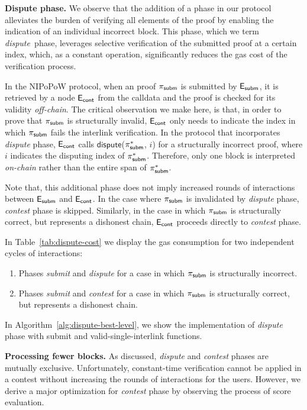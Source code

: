 \newcommand{\dispute}{\emph{dispute\ }} \noindent \textbf{Dispute phase.} We
observe that the addition of a phase in our protocol alleviates the burden of
verifying all elements of the proof by enabling the indication of an individual
incorrect block. This phase, which we term \dispute phase, leverages selective
verification of the submitted proof at a certain index, which, as a constant
operation, significantly reduces the gas cost of the verification process.

In the NIPoPoW protocol, when an proof $\mathsf{\pi_{subm}}$ is submitted by $\mathsf{E_{subm}}$, it is
retrieved by a node $\mathsf{E_{cont}}$ from the calldata and the proof is checked for its
validity \emph{off-chain}. The critical observation we make here, is that, in
order to prove that $\mathsf{\pi_{subm}}$ is structurally invalid, $\mathsf{E_{cont}}$ only needs to
indicate the index in which $\mathsf{\pi_{subm}}$ fails the interlink verification. In the
protocol that incorporates \emph{dispute} phase, $\mathsf{E_{cont}}$ calls
$\textsf{dispute}$($\mathsf{\pi_{subm}^*}$, $i$) for a structurally incorrect proof, where $i$
indicates the disputing index of $\mathsf{\pi_{subm}^*}$. Therefore, only one block is
interpreted \emph{on-chain} rather than the entire span of $\mathsf{\pi_{subm}^*}$.

Note that, this additional phase does not imply increased rounds of
interactions between $\mathsf{E_{subm}}$ and $\mathsf{E_{cont}}$. In the case where $\mathsf{\pi_{subm}}$ is invalidated
by \emph{dispute} phase, \emph{contest} phase is skipped.  Similarly, in the
case in which $\mathsf{\pi_{subm}}$ is structurally correct, but represents a dishonest
chain, $\mathsf{E_{cont}}$ proceeds directly to \emph{contest} phase.

In Table~\ref{tab:dispute-cost} we display the gas consumption for
two independent cycles of interactions:
\begin{enumerate}
    \item Phases \emph{submit} and \emph{dispute} for a case in which $\mathsf{\pi_{subm}}$
is structurally incorrect.
    \item Phases \emph{submit} and \emph{contest} for a case in which
$\mathsf{\pi_{subm}}$ is structurally correct, but represents a dishonest chain.
\end{enumerate}
\noindent
In Algorithm~\ref{alg:dispute-best-level}, we show the implementation of
\emph{dispute} phase with \textsf{submit} and \textsf{valid-single-interlink}
functions.




\textbf{Processing fewer blocks.} As discussed, \emph{dispute} and
\emph{contest} phases are mutually exclusive. Unfortunately, constant-time
verification cannot be applied in a contest without increasing the rounds
of interactions for the users. However, we derive a major
optimization for \emph{contest} phase by observing the process of score
evaluation.

